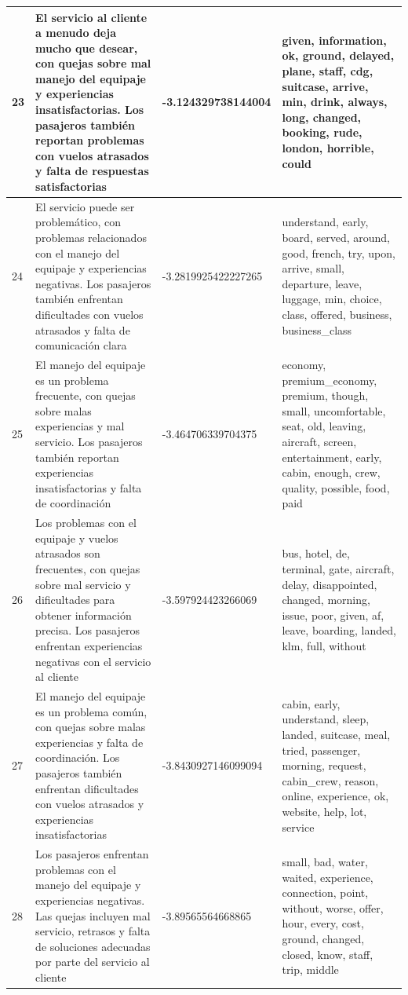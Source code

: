 \documentclass{report}
\begin{document}
{{\begin{longtable}{|p{1cm}|p{4cm}|p{4cm}|p{6cm}|}
                    \hline
                    23 & El servicio al cliente a menudo deja mucho que desear, con quejas sobre mal manejo del equipaje y experiencias insatisfactorias. Los pasajeros también reportan problemas con vuelos atrasados y falta de respuestas satisfactorias & -3.124329738144004 & given, information, ok, ground, delayed, plane, staff, cdg, suitcase, arrive, min, drink, always, long, changed, booking, rude, london, horrible, could \\
                    \hline
                    24 & El servicio puede ser problemático, con problemas relacionados con el manejo del equipaje y experiencias negativas. Los pasajeros también enfrentan dificultades con vuelos atrasados y falta de comunicación clara & -3.2819925422227265 & understand, early, board, served, around, good, french, try, upon, arrive, small, departure, leave, luggage, min, choice, class, offered, business, business\_class \\
                    \hline
                    25 & El manejo del equipaje es un problema frecuente, con quejas sobre malas experiencias y mal servicio. Los pasajeros también reportan experiencias insatisfactorias y falta de coordinación & -3.464706339704375 & economy, premium\_economy, premium, though, small, uncomfortable, seat, old, leaving, aircraft, screen, entertainment, early, cabin, enough, crew, quality, possible, food, paid \\
                    \hline
                    26 & Los problemas con el equipaje y vuelos atrasados son frecuentes, con quejas sobre mal servicio y dificultades para obtener información precisa. Los pasajeros enfrentan experiencias negativas con el servicio al cliente & -3.597924423266069 & bus, hotel, de, terminal, gate, aircraft, delay, disappointed, changed, morning, issue, poor, given, af, leave, boarding, landed, klm, full, without \\
                    \hline
                    27 & El manejo del equipaje es un problema común, con quejas sobre malas experiencias y falta de coordinación. Los pasajeros también enfrentan dificultades con vuelos atrasados y experiencias insatisfactorias & -3.8430927146099094 & cabin, early, understand, sleep, landed, suitcase, meal, tried, passenger, morning, request, cabin\_crew, reason, online, experience, ok, website, help, lot, service \\
                    \hline
                    28 & Los pasajeros enfrentan problemas con el manejo del equipaje y experiencias negativas. Las quejas incluyen mal servicio, retrasos y falta de soluciones adecuadas por parte del servicio al cliente & -3.89565564668865 & small, bad, water, waited, experience, connection, point, without, worse, offer, hour, every, cost, ground, changed, closed, know, staff, trip, middle \\

\end{longtable}}}
\end{document}
